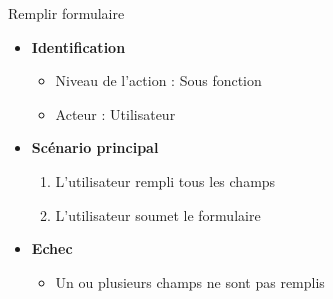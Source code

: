 \documentclass[9pt,xcolor=dvipsnames]{beamer}
\begin{document}
\begin{frame}{Remplir formulaire}
\begin{minipage}{0.40\textwidth}
  \end{minipage}
  \hfill
  \begin{minipage}{0.5\textwidth}
    \begin{flushright}
      \begin{itemize}
      \item \textbf{Identification}
        \begin{itemize}
        \item[] Niveau de l'action : Sous fonction
        \item[] Acteur : Utilisateur
        \end{itemize}
      \item \textbf{Scénario principal}
        \begin{enumerate}
        \item L'utilisateur rempli tous les champs
        \item L'utilisateur soumet le formulaire
        \end{enumerate}
      \item \textbf{Echec}
        \begin{itemize}
        \item Un ou plusieurs champs ne sont pas remplis
        \end{itemize}
      \end{itemize}
    \end{flushright}
  \end{minipage}
\end{frame}
\end{document}
